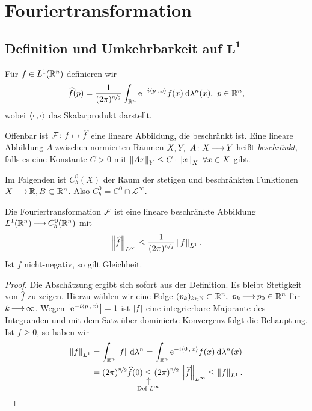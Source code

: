 \documentclass[skript.tex]{subfiles}
\begin{document}
\chapter{Fouriertransformation}
\setcounter{cntr}{0}
\section[Definition und Umkehrbarkeit auf \texorpdfstring{$L^1$}{L1}]{Definition und Umkehrbarkeit auf \texorpdfstring{$\boldsymbol{L^1}$}{L1}}
\begin{defin}[Fouriertransformation]
	Für $f \in L^1(\mathbb{R}^n)$ definieren wir
	\[
		\widehat{f}(p) = \frac{1}{(2\pi)^{\nicefrac{n}{2}}} \int_{\mathbb{R}^n} \mathrm{e}^{-i \langle p\,{,}\,x \rangle} f(x) \: \mathrm{d} \lambda^n(x),\ p\in \mathbb{R}^n,
	\]
	wobei $\langle \cdot\,{,}\,\cdot \rangle$ das Skalarprodukt darstellt.
\end{defin}
Offenbar ist $\mathcal{F}\colon f \mapsto \widehat{f}$ eine lineare Abbildung, die beschränkt ist. Eine lineare Abbildung $A$ zwischen normierten Räumen $X,Y,\ A\colon X \kern -1pt \longrightarrow \kern -1pt Y$ heißt \textit{beschränkt}, falls es eine Konstante $C>0$ mit $\norm{Ax}_Y \leq C\cdot \norm{x}_X\ \forall x \in X$ gibt. 

Im Folgenden ist $C^0_b(X)$ der Raum der stetigen und beschränkten Funktionen $X\kern -1pt \longrightarrow \kern -1pt \mathbb{R}, B \subset \mathbb{R}^n$. Also $C^0_b = C^0 \cap \mathscr{L}^\infty$.

\begin{lem}
	Die Fouriertransformation $\mathcal{F}$ ist eine lineare beschränkte Abbildung $L^1({\mathbb{R}^n})  \kern -1pt \longrightarrow \kern -1pt C^0_b({\mathbb{R}^n})$ mit
	\[
		\left\lVert \widehat{f} \right\rVert_{L^\infty} \leq \frac{1}{(2\pi)^{\nicefrac{n}{2}}} \left\lVert f \right\rVert_{L^1}.
	\] 
	Ist $f$ nicht-negativ, so gilt Gleichheit. %
\end{lem}

\begin{proof}
	Die Abschätzung ergibt sich sofort aus der Definition. Es bleibt Stetigkeit von $\widehat{f}$ zu zeigen. Hierzu wählen wir eine Folge $(p_k)_{k\in\mathbb{N}} \subset {\mathbb{R}^n},\ p_k \kern -1pt \longrightarrow \kern -1pt p_0 \in {\mathbb{R}^n}$ für $k\kern -1pt \longrightarrow \kern -1pt\infty$. Wegen $\left| \mathrm{e}^{-i \langle p\,{,}\,x \rangle} \right|=1$ ist $\left| f \right|$ eine integrierbare Majorante des Integranden und mit dem Satz über dominierte Konvergenz folgt die Behauptung. Ist $f\geq0$, so haben wir 
	\begin{align*}
		\norm{f}_{L^1} &= \int_\Rn \abs{f} \md \lambda^n = \int_{\Rn} \e^{-i \skp{0}{x}} f(x) \md \lambda^n(x)\\
		&= (2\pi)^{\nicefrac{n}{2}} \widehat{f}(0) \uarrow{\text{Def }L^\infty}{\leq} (2\pi)^{\nicefrac{n}{2}} \norm{\widehat{f}}_{L^\infty} \leq \norm{f}_{L^1}.
	\end{align*}
\end{proof}
\end{document}
